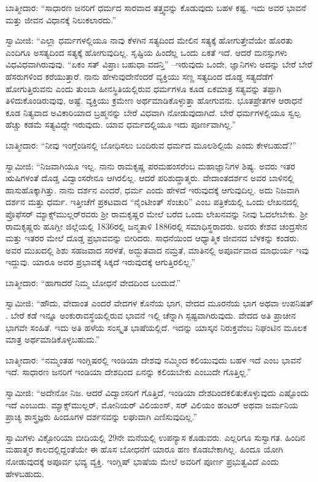 ಬಾತ್ಮೀದಾರ: “ಸಾಧಾರಣ ಜನರಿಗೆ ಧರ್ಮದ ಸಾರವಾದ ತತ್ತ್ವವನ್ನು ಕೊಡುವುದು ಬಹಳ ಕಷ್ಟ. ಇದು ಅವರ ಭಾವನೆ ಮತ್ತು ಜೀವನ ವಿಧಾನಕ್ಕೆ ನಿಲುಕಲಾರದು.”

ಸ್ವಾಮೀಜಿ: “ಎಲ್ಲಾ ಧರ್ಮಗಳಲ್ಲಿಯೂ ನಾವು ಕೆಳಗಿನ ಸತ್ಯದಿಂದ ಮೇಲಿನ ಸತ್ಯಕ್ಕೆ ಹೋಗುತ್ತೇವೆಯೇ ಹೊರತು ಎಂದಿಗೂ ಅಸತ್ಯದಿಂದ ಸತ್ಯಕ್ಕೆ ಹೋಗುವುದಿಲ್ಲ. ಸೃಷ್ಟಿಯ ಹಿಂದೆಲ್ಲ ಒಂದು ಏಕತೆ ಇದೆ. ಆದರೆ ಮನಸ್ಸುಗಳು ವಿಧವಿಧವಾಗಿರುವುವು. “ಏಕಂ ಸತ್​ ವಿಪ್ರಾಃ ಬಹುಧಾ ವದನ್ತಿ” –ಇರುವುದು ಒಂದೇ, ಜ್ಞಾನಿಗಳು ಅದನ್ನು ಬೇರೆ ಬೇರೆ ಹೆಸರುಗಳಿಂದ ಕರೆಯುತ್ತಾರೆ. ನಾನು ಹೇಳುವುದೇನೆಂದರೆ ವ್ಯಕ್ತಿಯು ಸಣ್ಣ ಸತ್ಯದಿಂದ ದೊಡ್ಡ ಸತ್ಯದೆಡೆಗೆ ಹೋಗುತ್ತಿರುವನು ಎಂದು ತುಂಬಾ ಹೀನಸ್ಥಿತಿಯಲ್ಲಿರುವ ಧರ್ಮಗಳೂ ಕೂಡ ಏಕಮಾತ್ರ ಸತ್ಯವನ್ನು ತಪ್ಪಾಗಿ ತಿಳಿದುಕೊಂಡಿರುವುವು, ಅಷ್ಟೆ. ವ್ಯಕ್ತಿಯು ಕ್ರಮೇಣ ಅರ್ಥಮಾಡಿಕೊಳ್ಳುತ್ತಾ ಹೋಗುವನು. ಭೂತಪ್ರೇತಗಳ ಆರಾಧನೆ ಕೂಡ ನಿತ್ಯವಾದ ಅವಿಕಾರಿಯಾದ ಬ್ರಹ್ಮನನ್ನು ಬೇರೆ ವಿಧವಾಗಿ ನೋಡುವುದಾಗಿದೆ. ಬೇರೆ ಧರ್ಮಗಳಲ್ಲಿಯೂ ಸ್ವಲ್ಪ ಹೆಚ್ಚು ಕಡಮೆ ಸತ್ಯವಿದ್ದೇ ಇರುವುದು. ಯಾವ ಧರ್ಮದಲ್ಲಿಯೂ ಇದು ಪೂರ್ಣವಾಗಿಲ್ಲ.”

ಬಾತ್ಮೀದಾರ: “ನೀವು ಇಂಗ್ಲೆಂಡಿನಲ್ಲಿ ಬೋಧಿಸಲು ಬಂದಿರುವ ಧರ್ಮದ ಮೂಲಶಿಲ್ಪಿಯೆ ಎಂದು ಕೇಳಬಹುದೆ?”

ಸ್ವಾಮೀಜಿ: “ನಿಜವಾಗಿಯೂ ಇಲ್ಲ. ನಾನು ರಾಮಕೃಷ್ಣ ಪರಮಹಂಸರೆಂಬ ಮಹಾಜ್ಞಾನಿಗಳ ಶಿಷ್ಯ. ಅವರು ಇತರ ಋಷಿಗಳಂತೆ ದೊಡ್ಡ ವಿದ್ವಾಂಸರೇನೂ ಆಗಿರಲಿಲ್ಲ. ಆದರೆ ಪರಿಶುದ್ಧಾತ್ಮರು. ವೇದಾಂತದರ್ಶನ ಅವರ ಬಾಳಿನಲ್ಲಿ ಹಾಸುಹೊಕ್ಕಾಗಿತ್ತು. ನಾನು ದರ್ಶನ ಎಂದರೆ, ಧರ್ಮ ಎಂದು ಹೇಳದೆ ಇರುವುದಕ್ಕೆ ಆಗುವುದಿಲ್ಲ. ಅದು ನಿಜವಾಗಿ ದರ್ಶನ ಮತ್ತು ಧರ್ಮ. ಇತ್ತೀಚೆಗೆ ಪ್ರಕಟವಾದ “ನೈಂಟೀಂತ್​ ಸೆಂಚುರಿ” ಎಂಬ ಪತ್ರಿಕೆಯಲ್ಲಿ ಒಂದು ಲೇಖನದಲ್ಲಿ ಪ್ರೊಫೆಸರ್​ ಮ್ಯಾಕ್ಸ್​ಮುಲ್ಲರ್​ರವರು ಶ‍್ರೀ ರಾಮಕೃಷ್ಣರ ಮೇಲೆ ಬರೆದ ಒಂದು ಲೇಖನವನ್ನು ನೀವು ಓದಲೇಬೇಕು. ಶ‍್ರೀ ರಾಮಕೃಷ್ಣರು ಹೂಗ್ಲೀ ಜಿಲ್ಲೆಯಲ್ಲಿ 1836ರಲ್ಲಿ ಜನ್ಮತಾಳಿ 1886ರಲ್ಲಿ ಸಮಾಧಿಸ್ಥರಾದರು. ಅವರು ಕೇಶವ ಚಂದ್ರಸೇನ ಮತ್ತು ಇತರರ ಮೇಲೆ ದೊಡ್ಡ ಪ್ರಭಾವವನ್ನು ಬೀರಿದರು. ಸಾಧನೆಯಿಂದ ಆಧ್ಯಾತ್ಮಿಕ ಜೀವನದ ಬೆಳಕನ್ನು ಕಂಡರು. ಅವರ ಮುಖದಲ್ಲಿ ಶಿಶು ಸಹಜವಾದ ಸರಳತೆ, ಅದ್ಭುತವಾದ ನಮ್ರತೆ, ಮಾತಿನಲ್ಲಿ ಅಪೂರ್ವವಾದ ಮಾಧುರ್ಯ ಇವು ಇದ್ದುವು. ಯಾರೂ ಅವರ ಪ್ರಭಾವಕ್ಕೆ ಸಿಕ್ಕದೆ ಇರುವುದಕ್ಕೆ ಆಗುತ್ತಿರಲಿಲ್ಲ.”

ಬಾತ್ಮೀದಾರ: “ಹಾಗಾದರೆ ನಿಮ್ಮ ಬೋಧನೆ ವೇದದಿಂದ ಬಂದುದೆ.”

ಸ್ವಾಮೀಜಿ: “ಹೌದು, ವೇದಾಂತ ಎಂದರೆ ವೇದಗಳ ಕೊನೆಯ ಭಾಗ, ವೇದದ ಮೂರನೆಯ ಭಾಗ ಅಥವಾ ಉಪನಿಷತ್​. ಬೇರೆ ಕಡೆ ಇನ್ನೂ ಅಂಕುರಾವಸ್ಥೆಯಲ್ಲಿರುವ ಭಾವನೆ ಇಲ್ಲಿ ಚೆನ್ನಾಗಿ ಸ್ಪಷ್ಟವಾಗಿರುವುದು. ವೇದದ ಅತಿ ಪ್ರಾಚೀನ ಭಾಗವೇ ಸಂಹಿತೆ. ಇದು ಅತಿ ಹಳೆಯ ಸಂಸ್ಕೃತ ಭಾಷೆಯಲ್ಲಿದೆ. ಇದನ್ನು ಯಾಸ್ಕನ ನಿರುಕ್ತವೆಂಬ ನಿಘಂಟಿನ ಮೂಲಕ ಮಾತ್ರ ಅರ್ಥಮಾಡಿಕೊಳ್ಳಬಹುದು.”

ಬಾತ್ಮೀದಾರ: “ನಮ್ಮಂತಹ ಇಂಗ್ಲಿಷರಲ್ಲಿ ಇಂಡಿಯಾ ದೇಶವು ನಮ್ಮಿಂದ ಕಲಿಯುವುದು ಬಹಳ ಇದೆ ಎಂಬ ಭಾವನೆ ಇದೆ. ಸಾಧಾರಣ ಜನರಿಗೆ ಇಂಡಿಯಾ ದೇಶದಿಂದ ಏನನ್ನು ಕಲಿಯಬೇಕು ಎಂಬುದೇ ಗೊತ್ತಿಲ್ಲ.”

ಸ್ವಾಮೀಜಿ: “ಅದೇನೋ ನಿಜ. ಆದರೆ ವಿದ್ವಾಂಸರಿಗೆ ಗೊತ್ತಿದೆ, ಇಂಡಿಯಾ ದೇಶದಿಂದ\break ಕಲಿತುಕೊಳ್ಳುವುದು ಎಷ್ಟೊಂದು ಇದೆ ಎಂಬುದು. ಮ್ಯಾಕ್ಸ್​ಮುಲ್ಲರ್​, ಮೋನಿಯರ್​ ವಿಲಿಯಂಸ್​, ಸರ್​ ವಿಲಿಯಂ ಹಂಟರ್​ ಅಥವಾ ಜರ್ಮನಿಯ ಪ್ರಾಚ್ಯ ಶಾಸ್ತ್ರಜ್ಞರು ಹಿಂದೂಗಳ ದರ್ಶನವನ್ನು ಲಘುವಾಗಿ ಎಣಿಸುವುದಿಲ್ಲ.”

\delimiter

ಸ್ವಾಮಿಗಳು ವಿಕ್ಟೋರಿಯಾ ಬೀದಿಯಲ್ಲಿ 29ನೇ ಮನೆಯಲ್ಲಿ ಉಪನ್ಯಾಸ ಕೊಡುವರು. ಎಲ್ಲರಿಗೂ ಸುಸ್ವಾಗತ. ಹಿಂದಿನ ಮಹಾತ್ಮರ ಕಾಲದಲ್ಲಿದ್ದಂತೆಯೇ ಈ ಹೊಸ ಬೋಧನೆಗೆ ಯಾರೂ ಹಣ ಕೊಡಬೇಕಾಗಿಲ್ಲ. ಹಿಂದೂ ಯೋಗಿ ನೋಡುವುದಕ್ಕೆ ಅಪೂರ್ವ ಭವ್ಯ ವ್ಯಕ್ತಿ. ಇಂಗ್ಲಿಷ್​ ಭಾಷೆಯ ಮೇಲೆ ಅವರಿಗೆ ಪೂರ್ಣ ಪ್ರಭುತ್ವವಿದೆ ಎಂದು ಹೇಳಬಹುದು.

